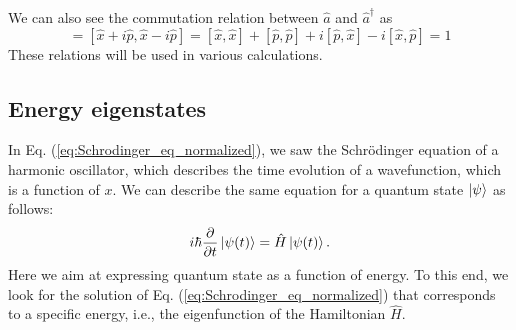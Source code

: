 \documentclass{book}
\begin{document}
We can also see the commutation relation between $\hat a$ and $\hat a^\dagger$ as
\begin{equation}
  [\hat a, \hat a^\dagger] = [\hat x + i\hat p, \hat x - i\hat p] = [\hat x,\hat x] + [\hat p, \hat p] + i[\hat p, \hat x] - i[\hat x, \hat p] = 1
\end{equation}
These relations will be used in various calculations.

\subsection{Energy eigenstates}

In Eq. (\ref{eq:Schrodinger_eq_normalized}), we saw the Schr\"odinger equation of a harmonic oscillator, which describes the time evolution of a wavefunction, which is a function of $x$. We can describe the same equation for a quantum state $\ket \psi$ as follows:
\begin{equation}
i\hbar\frac{\partial}{\partial t}\ket {\psi(t)} = \hat H \ket {\psi(t)}.
\label{eq:Schrodinger_eq_for_quantum_state}
\end{equation}
Here we aim at expressing quantum state as a function of energy. To this end, we look for the solution of Eq. (\ref{eq:Schrodinger_eq_normalized}) that corresponds to a specific energy, i.e., the eigenfunction of the Hamiltonian $\hat H$.
\end{document}
